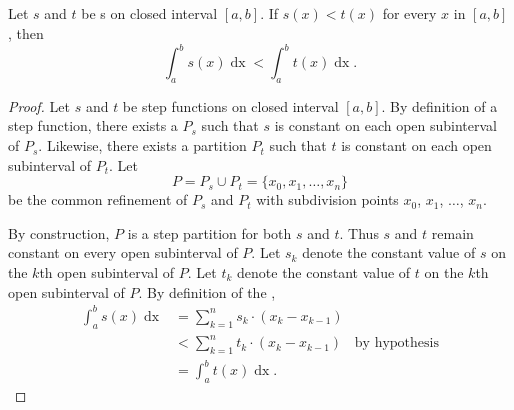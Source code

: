 \documentclass{report}
\begin{document}
\subsection{}%
\label{sub:step-comparison-theorem}
\label{sub:theorem-1.5}

\begin{theorem}[1.5]

  Let $s$ and $t$ be s on closed interval
    $[a, b]$.
  If $s(x) < t(x)$ for every $x$ in $[a, b]$, then
    $$\int_a^b s(x) \mathop{dx} < \int_a^b t(x) \mathop{dx}.$$

\end{theorem}

\begin{proof}

  Let $s$ and $t$ be step functions on closed interval $[a, b]$.
  By definition of a step function, there exists a 
    $P_s$ such that $s$ is constant on each open subinterval of $P_s$.
  Likewise, there exists a partition $P_t$ such that $t$ is constant on each
    open subinterval of $P_t$.
  Let $$P = P_s \cup P_t = \{x_0, x_1, \ldots, x_n\}$$ be the common refinement
    of $P_s$ and $P_t$ with subdivision points $x_0$, $x_1$, $\ldots$, $x_n$.

  By construction, $P$ is a step partition for both $s$ and $t$.
  Thus $s$ and $t$ remain constant on every open subinterval of $P$.
  Let $s_k$ denote the constant value of $s$ on the $k$th open subinterval of
    $P$.
  Let $t_k$ denote the constant value of $t$ on the $k$th open subinterval of
    $P$.
  By definition of the ,
    \begin{align*}
      \int_a^b s(x) \mathop{dx}
        & = \sum_{k=1}^n s_k \cdot (x_k - x_{k-1}) \\
        & < \sum_{k=1}^n t_k \cdot (x_k - x_{k-1}) & \text{by hypothesis} \\
        & = \int_a^b t(x) \mathop{dx}.
    \end{align*}

\end{proof}

\subsection{}%
\label{sub:step-additivity-with-respect-interval-integration}
\label{sub:theorem-1.6}
\end{document}
